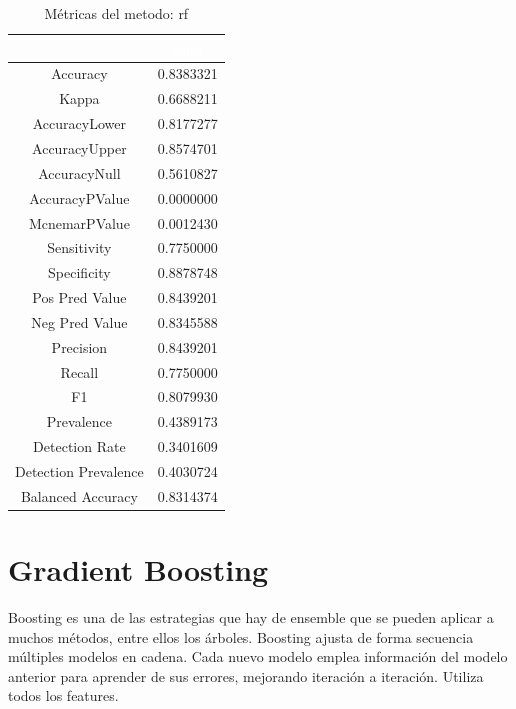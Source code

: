 \documentclass[]{article}
\begin{document}
\begin{table}[!h]

\caption{\label{tab:metricas_rf}Métricas del metodo: rf }
\centering
\begin{tabular}[t]{cc}
\toprule
\rowcolor{black}  \multicolumn{1}{c}{\textcolor{white}{\textbf{metricas}}} & \multicolumn{1}{c}{\textcolor{white}{\textbf{valor}}}\\
\midrule
\rowcolor{gray!6}  Accuracy & 0.8383321\\
Kappa & 0.6688211\\
\rowcolor{gray!6}  AccuracyLower & 0.8177277\\
AccuracyUpper & 0.8574701\\
\rowcolor{gray!6}  AccuracyNull & 0.5610827\\
\addlinespace
AccuracyPValue & 0.0000000\\
\rowcolor{gray!6}  McnemarPValue & 0.0012430\\
Sensitivity & 0.7750000\\
\rowcolor{gray!6}  Specificity & 0.8878748\\
Pos Pred Value & 0.8439201\\
\addlinespace
\rowcolor{gray!6}  Neg Pred Value & 0.8345588\\
Precision & 0.8439201\\
\rowcolor{gray!6}  Recall & 0.7750000\\
F1 & 0.8079930\\
\rowcolor{gray!6}  Prevalence & 0.4389173\\
\addlinespace
Detection Rate & 0.3401609\\
\rowcolor{gray!6}  Detection Prevalence & 0.4030724\\
Balanced Accuracy & 0.8314374\\
\bottomrule
\end{tabular}
\end{table}

\hypertarget{gradient-boosting}{%
\section{Gradient Boosting}\label{gradient-boosting}}

Boosting es una de las estrategias que hay de ensemble que se pueden
aplicar a muchos métodos, entre ellos los árboles. Boosting ajusta de
forma secuencia múltiples modelos en cadena. Cada nuevo modelo emplea
información del modelo anterior para aprender de sus errores, mejorando
iteración a iteración. Utiliza todos los features.
\end{document}
